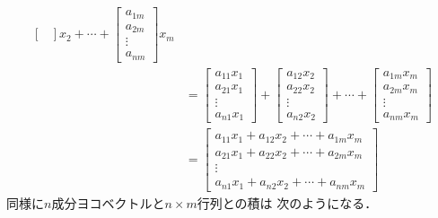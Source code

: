 \documentclass[11pt, a4paper, dvipdfmx]{jsarticle}
\theoremstyle{definition}
\theoremstyle{mystyle}
\numberwithin{equation}{section} %
\begin{document}
\begin{align*}
\begin{bmatrix}
    \end{bmatrix}x_2+\cdots+
    \begin{bmatrix}
        a_{1m}\\a_{2m}\\\vdots\\a_{nm}
    \end{bmatrix}x_m\\
    &= \begin{bmatrix}
        a_{11}x_1\\a_{21}x_1\\\vdots\\a_{n1}x_1
    \end{bmatrix}
    +\begin{bmatrix}
        a_{12}x_2\\a_{22}x_2\\\vdots\\a_{n2}x_2 
    \end{bmatrix}+\cdots+
    \begin{bmatrix}
        a_{1m}x_m\\a_{2m}x_m\\\vdots\\a_{nm}x_m
    \end{bmatrix}\\
    &=\begin{bmatrix}
        a_{11}x_1+a_{12}x_2+\cdots+a_{1m}x_m\\
        a_{21}x_1+a_{22}x_2+\cdots+a_{2m}x_m\\
        \vdots\\
        a_{n1}x_1+a_{n2}x_2+\cdots+a_{nm}x_m
    \end{bmatrix}
\end{align*}
同様に$n$成分ヨコベクトルと$n\times m$行列との積は
次のようになる．
\end{document}
